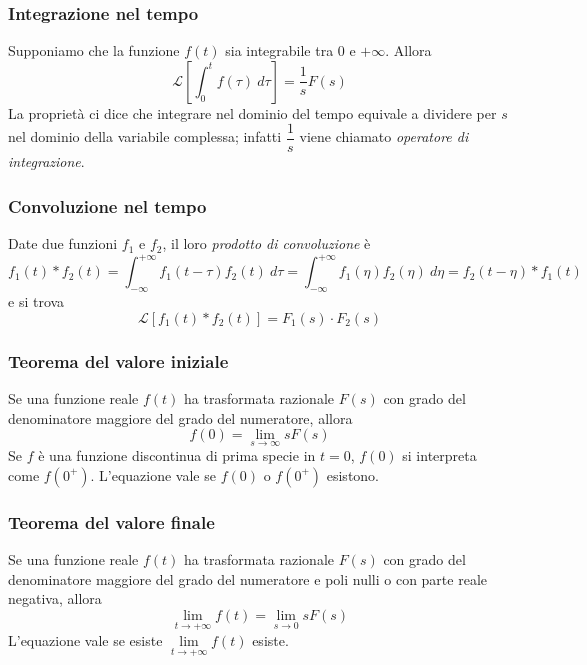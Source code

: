 \documentclass{article}
\numberwithin{equation}{subsection}
\begin{document}
\subsubsection{Integrazione nel tempo}
Supponiamo che la funzione $f(t)$ sia integrabile tra 0 e $+ \infty$. Allora
\begin{equation}
    \mathcal{L} \left[\int_0^tf(\tau) \ d\tau\right] = \frac{1}{s} F(s)
\end{equation}
La proprietà ci dice che integrare nel dominio del tempo equivale a dividere per $s$ nel dominio della variabile complessa; infatti $\dfrac{1}{s}$ viene chiamato \textit{operatore di integrazione}.


\subsubsection{Convoluzione nel tempo}
Date due funzioni $f_1$ e $f_2$, il loro \textit{prodotto di convoluzione} è
\begin{equation}
    f_1(t) \ast f_2(t) = \int_{-\infty}^{+\infty} f_1(t -\tau)f_2(t) \ d\tau = \int_{-\infty}^{+\infty} f_1(\eta)f_2(\eta) \ d\eta = f_2(t-\eta) \ast f_1(t)
\end{equation}
e si trova
\begin{equation}
    \mathcal{L}[f_1(t) \ast f_2(t)] = F_1(s) \cdot F_2(s)
\end{equation}

\subsubsection{Teorema del valore iniziale}
Se una funzione reale $f(t)$ ha trasformata razionale $F(s)$ con grado del denominatore maggiore del grado del numeratore, allora
\begin{equation}
    f(0) = \lim_{s\rightarrow \infty} s F(s)
\end{equation}
Se $f$ è una funzione discontinua di prima specie in $t=0$, $f(0)$ si interpreta come $f(0^+)$. L'equazione vale se $f(0)$ o $f(0^+)$ esistono.


\subsubsection{Teorema del valore finale}
Se una funzione reale $f(t)$ ha trasformata razionale $F(s)$ con grado del denominatore maggiore del grado del numeratore e poli nulli o con parte reale negativa, allora
\begin{equation}
    \lim_{t \rightarrow + \infty} f(t) = \lim_{s\rightarrow 0} s F(s)
\end{equation}
L'equazione vale se esiste $\lim\limits_{t \rightarrow + \infty}f(t)$ esiste.
\end{document}
